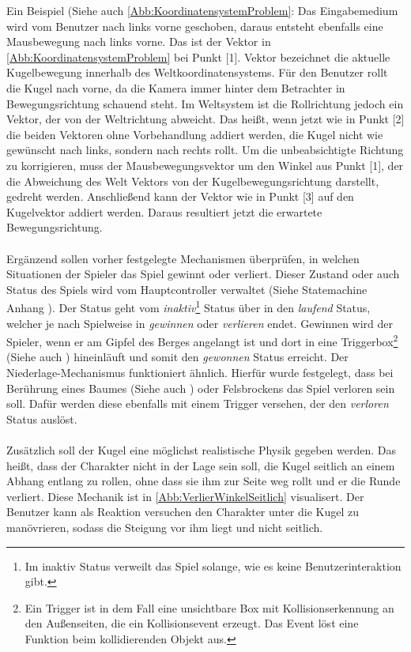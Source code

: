 Ein Beispiel (Siehe auch \autoref{Abb:KoordinatensystemProblem}: Das Eingabemedium wird vom Benutzer nach links vorne geschoben, daraus entsteht ebenfalls eine Mausbewegung nach links vorne. Das ist der Vektor  in \autoref{Abb:KoordinatensystemProblem} bei Punkt [1]. Vektor  bezeichnet die aktuelle Kugelbewegung innerhalb des Weltkoordinatensystems. Für den Benutzer rollt die Kugel nach vorne, da die Kamera immer hinter dem Betrachter in Bewegungsrichtung schauend steht. Im Weltsystem ist die Rollrichtung jedoch ein Vektor, der von der Weltrichtung  abweicht. Das heißt, wenn jetzt wie in Punkt [2] die beiden Vektoren ohne Vorbehandlung addiert werden, die Kugel nicht wie gewünscht nach links, sondern nach rechts rollt. Um die unbeabsichtigte Richtung zu korrigieren, muss der Mausbewegungsvektor  um den Winkel \alp{} aus Punkt [1], der die Abweichung des Welt  Vektors von der Kugelbewegungsrichtung darstellt, gedreht werden. Anschließend kann der  Vektor wie in Punkt [3] auf den Kugelvektor  addiert werden. Daraus resultiert jetzt die erwartete Bewegungsrichtung.
\paragraph{}
Ergänzend sollen vorher festgelegte Mechanismen überprüfen, in welchen Situationen der Spieler das Spiel gewinnt oder verliert. Dieser Zustand oder auch Status des Spiels wird vom Hauptcontroller verwaltet (Siehe Statemachine Anhang ). Der Status geht vom \textit{inaktiv}\footnote{Im inaktiv Status verweilt das Spiel solange, wie es keine Benutzerinteraktion gibt.} Status über in den \textit{laufend} Status, welcher je nach Spielweise in \textit{gewinnen} oder \textit{verlieren} endet. Gewinnen wird der Spieler, wenn er am Gipfel des Berges angelangt ist und dort in eine Triggerbox\footnote{Ein Trigger ist in dem Fall eine unsichtbare Box mit Kollisionserkennung an den Außenseiten, die ein Kollisionsevent erzeugt. Das Event löst eine Funktion beim kollidierenden Objekt aus.} (Siehe auch ) hineinläuft und somit den \textit{gewonnen} Status erreicht. Der Niederlage-Mechanismus funktioniert ähnlich. Hierfür wurde festgelegt, dass bei Berührung eines Baumes (Siehe auch ) oder Felsbrockens das Spiel verloren sein soll. Dafür werden diese ebenfalls mit einem Trigger versehen, der den \textit{verloren} Status auslöst.
\paragraph{}
Zusätzlich soll der Kugel eine möglichst realistische Physik gegeben werden. Das heißt, dass der Charakter nicht in der Lage sein soll, die Kugel seitlich an einem Abhang entlang zu rollen, ohne dass sie ihm zur Seite weg rollt und er die Runde verliert. Diese Mechanik ist in \autoref{Abb:VerlierWinkelSeitlich} visualisert. Der Benutzer kann als Reaktion versuchen den Charakter unter die Kugel zu manövrieren, sodass die Steigung vor ihm liegt und nicht seitlich.

